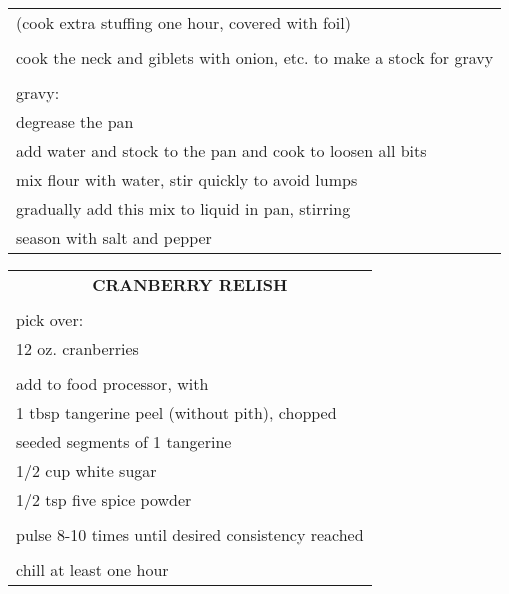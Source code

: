 \documentclass[8pt]{report}
\begin{document}
\begin{tabular}{|l|}
(cook extra stuffing one hour, covered with foil)\\
\\
cook the neck and giblets with onion, etc. to make a stock for gravy\\
\\
gravy:\\
\hspace{0.5 in}	degrease the pan\\
\hspace{0.5 in}	add water and stock to the pan and cook to loosen all bits\\
\hspace{0.5 in}	mix flour with water, stir quickly to avoid lumps\\
\hspace{0.5 in}	gradually add this mix to liquid in pan, stirring\\
\hspace{0.5 in}	season with salt and pepper\\

\hline

\end{tabular}

\newpage
\normalsize
\centering

\begin{tabular}{|l|} \hline	%
 
\multicolumn{1}{|c|}{\textbf{CRANBERRY RELISH}}
\\
\\

\index{fish/meat!turkey (willa mae)!cranberry relish} \index{cranberry
relish} \index{sauce!cranberry relish} \index{turkey!cranberry relish}

pick over:\\
\hspace{0.5 in}	12 oz. cranberries\\
\\
add to food processor, with\\
\hspace{0.5 in} 1 tbsp tangerine peel (without pith), chopped\\
\hspace{0.5 in} seeded segments of 1 tangerine\\
\hspace{0.5 in} 1/2 cup white sugar\\
\hspace{0.5 in} 1/2 tsp five spice powder\\
\\
pulse 8-10 times until desired consistency reached\\
\\
chill at least one hour\\
\hline
\end{tabular}
\end{document}
